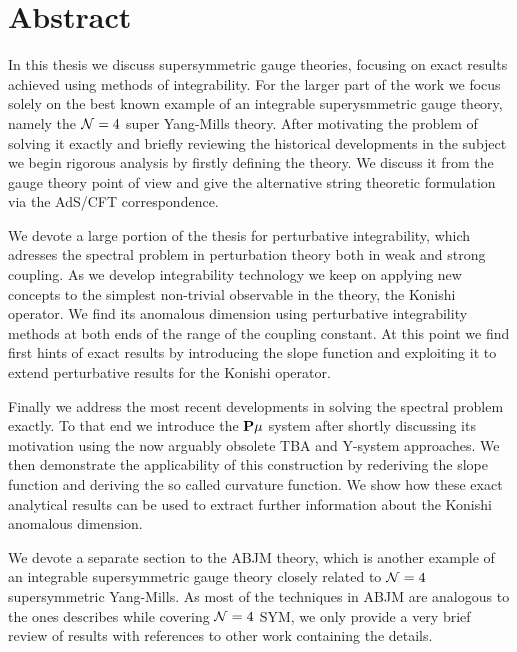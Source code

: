 
\section*{Abstract}

\vspace{30pt}

In this thesis we discuss supersymmetric gauge theories, focusing on exact results achieved using methods of integrability. 
For the larger part of the work we focus solely on the best known example of an integrable superysmmetric gauge theory, namely the $\mathcal{N}=4$ super Yang-Mills theory.
After motivating the problem of solving it exactly and briefly reviewing the historical developments in the subject we begin rigorous analysis by firstly defining the theory. 
We discuss it from the gauge theory point of view and give the alternative string theoretic formulation via the AdS/CFT correspondence.

We devote a large portion of the thesis for perturbative integrability, which adresses the spectral problem in perturbation theory both in weak and strong coupling. 
As we develop integrability technology we keep on applying new concepts to the simplest non-trivial observable in the theory, the Konishi operator.
We find its anomalous dimension using perturbative integrability methods at both ends of the range of the coupling constant.
At this point we find first hints of exact results by introducing the slope function and exploiting it to extend perturbative results for the Konishi operator.

Finally we address the most recent developments in solving the spectral problem exactly.
To that end we introduce the ${\bf P}\mu$ system after shortly discussing its motivation using the now arguably obsolete TBA and Y-system approaches. 
We then demonstrate the applicability of this construction by rederiving the slope function and deriving the so called curvature function.
We show how these exact analytical results can be used to extract further information about the Konishi anomalous dimension. 

We devote a separate section to the ABJM theory, which is another example of an integrable supersymmetric gauge theory closely related to $\mathcal{N}=4$ supersymmetric Yang-Mills. 
As most of the techniques in ABJM are analogous to the ones describes while covering $\mathcal{N}=4$ SYM, we only provide a very brief review of results with references to other work containing the details.
